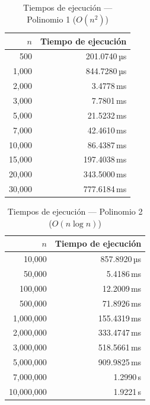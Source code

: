 \documentclass{article}
\begin{document}
\begin{table}[ht]
  \centering
  \caption{Tiempos de ejecución — Polinomio 1 ($O(n^2)$)}
  \label{tab:polinomio1}
  \begin{tabular}{rr}
    \toprule
    $n$ & Tiempo de ejecución \\
    \midrule
    500 & 201.0740\,µs \\
    1,000 & 844.7280\,µs \\
    2,000 & 3.4778\,ms \\
    3,000 & 7.7801\,ms \\
    5,000 & 21.5232\,ms \\
    7,000 & 42.4610\,ms \\
    10,000 & 86.4387\,ms \\
    15,000 & 197.4038\,ms \\
    20,000 & 343.5000\,ms \\
    30,000 & 777.6184\,ms \\
    \bottomrule
  \end{tabular}
\end{table}

\begin{table}[ht]
  \centering
  \caption{Tiempos de ejecución — Polinomio 2 ($O(n \log n)$)}
  \label{tab:polinomio2}
  \begin{tabular}{rr}
    \toprule
    $n$ & Tiempo de ejecución \\
    \midrule
    10,000 & 857.8920\,µs \\
    50,000 & 5.4186\,ms \\
    100,000 & 12.2009\,ms \\
    500,000 & 71.8926\,ms \\
    1,000,000 & 155.4319\,ms \\
    2,000,000 & 333.4747\,ms \\
    3,000,000 & 518.5661\,ms \\
    5,000,000 & 909.9825\,ms \\
    7,000,000 & 1.2990\,s \\
    10,000,000 & 1.9221\,s \\
    \bottomrule
  \end{tabular}
\end{table}
\end{document}
